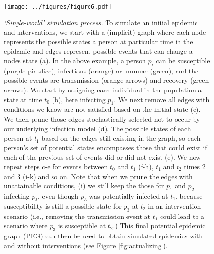 \documentclass[PTRSB]{rsos}
\begin{document}
\begin{multicols}{2}
\begin{figure}[hp]
\texttt{[image: ../figures/figure6.pdf]}
\caption{\textit{‘Single-world’ simulation process.}
  To simulate an initial epidemic and interventions, we start with a (implicit) graph where each node represents the possible states a person at particular time in the epidemic and edges represent possible events that can change a nodes state (a).
  In the above example, a person $p_i$ can be susceptible (purple pie slice), infectious (orange) or immune (green), and the possible events are transmission (orange arrows) and recovery (green arrows).
  We start by assigning each individual in the population a state at time $t_0$ (b), here infecting $p_1$.
  We next remove all edges with conditions we know are not satisfied based on the initial state (c).
  We then prune those edges stochastically selected not to occur by our underlying infection model (d).
  The possible states of each person at $t_1$ based on the edges still existing in the graph, so each person’s set of potential states encompasses those that could exist if each of the previous set of events did or did not exist (e).
  We now repeat steps c-e for events between $t_0$ and $t_1$ (f-h), $t_1$ and $t_2$ times 2 and 3 (i-k) and so on.
  Note that when we prune the edges with unattainable conditions, (i) we still keep the those for $p_1$ and $p_2$ infecting $p_3$, even though $p_3$ was potentially infected at $t_1$, because susceptibility is still a possible state for $p_3$ at $t_2$ in an intervention scenario (i.e., removing the transmission event at $t_1$ could lead to a scenario where $p_3$ is susceptible at $t_2$.)
  This final potential epidemic graph (PEG) can then be used to obtain simulated epidemics with and without interventions (see Figure \ref{fig:actualizing}).
}
\label{fig:pruning}
\end{figure}


\end{multicols}
\end{document}
